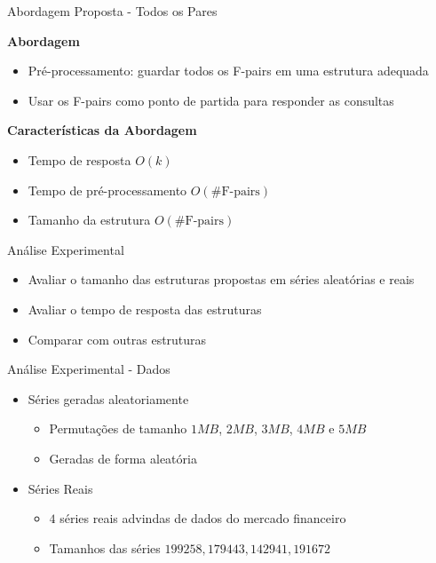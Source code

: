 \documentclass{beamer}
\begin{document}
\begin{frame}{Abordagem Proposta - Todos os Pares}

\textbf{Abordagem}

\begin{itemize}
\item Pré-processamento: guardar todos os F-pairs em uma estrutura adequada
\item Usar os F-pairs como ponto de partida para responder as consultas
\end{itemize}

\textbf{Características da Abordagem}
\begin{itemize}
\item Tempo de resposta $O(k)$
\item Tempo de pré-processamento $O(\#\text{F-pairs})$
\item Tamanho da estrutura $O(\#\text{F-pairs})$
\end{itemize}

\end{frame}

\begin{frame}{Análise Experimental}

\begin{itemize}
\item Avaliar o tamanho das estruturas propostas em séries aleatórias
			e reais
\item Avaliar o tempo de resposta das estruturas
\item Comparar com outras estruturas 
\end{itemize}

\end{frame}

\begin{frame}{Análise Experimental - Dados}

\begin{itemize}
\item Séries geradas aleatoriamente
\begin{itemize}
\item Permutações de tamanho $1MB$, $2MB$, $3MB$, $4MB$ e $5MB$
\item Geradas de forma aleatória
\end{itemize}

\item Séries Reais
\begin{itemize}
\item $4$ séries reais advindas de dados do mercado financeiro
\item Tamanhos das séries $199258, 179443, 142941, 191672$
\end{itemize}
\end{itemize}

\end{frame}
\end{document}
